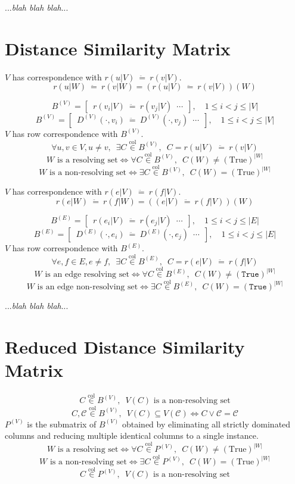 \documentclass{article}
\begin{document}
...\textit{blah blah blah}...

\clearpage
\section{Distance Similarity Matrix}

\(V\) has correspondence with \(r(u|V)\ \ddot{=}\ r(v|V)\).
\[ r(u|W)\ \ddot{=}\ r(v|W) = (r(u|V)\ \ddot{=}\ r(v|V))(W) \]

\[ B^{(V)} = \left[\enspace r(v_i|V)\ \ddot{=}\ r(v_j|V)\enspace \cdots\enspace \right],\quad 1 \leq i < j \leq |V| \]
\[ B^{(V)} = \left[\enspace D^{(V)}(\cdot, v_i)\ \ddot{=}\ D^{(V)}(\cdot, v_j) \enspace \cdots\enspace \right],\quad 1 \leq i < j \leq |V| \]
\(V\) has row correspondence with \(B^{(V)}\).
\[ \forall u, v \in V, u \neq v,\enspace \exists C \overset{\text{col}}{\in} B^{(V)},\enspace C = r(u|V)\ \ddot{=}\ r(v|V) \]
\[ W \text{ is a resolving set} \iff \forall C \overset{\text{col}}{\in} B^{(V)},\enspace C(W) \neq (\mathrm{True})^{|W|} \]
\[ W \text{ is a non-resolving set} \iff \exists C \overset{\text{col}}{\in} B^{(V)},\enspace C(W) = (\mathrm{True})^{|W|} \]

\vspace{2em}

\(V\) has correspondence with \(r(e|V)\ \ddot{=}\ r(f|V)\).
\[ r(e|W)\ \ddot{=}\ r(f|W) = ((e|V)\ \ddot{=}\ r(f|V))(W) \]

\[ B^{(E)} = \left[\enspace r(e_i|V)\ \ddot{=}\ r(e_j|V)\enspace \cdots\enspace \right],\quad 1 \leq i < j \leq |E| \]
\[ B^{(E)} = \left[\enspace D^{(E)}(\cdot, e_i)\ \ddot{=}\ D^{(E)}(\cdot, e_j) \enspace \cdots\enspace \right],\quad 1 \leq i < j \leq |E| \]
\(V\) has row correspondence with \(B^{(E)}\).
\[ \forall e, f \in E, e \neq f,\enspace \exists C \overset{\mathrm{col}}{\in} B^{(E)},\enspace C = r(e|V)\ \ddot{=}\ r(f|V) \]
\[ W \text{ is an edge resolving set} \iff \forall C \overset{\mathrm{col}}{\in} B^{(E)},\enspace C(W) \neq (\mathtt{True})^{|W|} \]
\[ W \text{ is an edge non-resolving set} \iff \exists C \overset{\mathrm{col}}{\in} B^{(E)},\enspace C(W) = (\mathtt{True})^{|W|} \]

...\textit{blah blah blah}...

\clearpage
\section{Reduced Distance Similarity Matrix}

\[ C \overset{\mathrm{col}}{\in} B^{(V)},\enspace V(C) \text{ is a non-resolving set} \]
\[ C, \mathcal{C} \overset{\mathrm{col}}{\in} B^{(V)},\enspace V(C) \subseteq V(\mathcal{C}) \iff C \vee \mathcal{C} = \mathcal{C} \]
\(P^{(V)}\) is the submatrix of \(B^{(V)}\) obtained by eliminating all strictly dominated columns and reducing multiple identical columns to a single instance.
\[ W \text{ is a resolving set} \iff \forall C \overset{\mathrm{col}}{\in} P^{(V)},\enspace C(W) \neq (\mathrm{True})^{|W|} \]
\[ W \text{ is a non-resolving set} \iff \exists C \overset{\mathrm{col}}{\in} P^{(V)},\enspace C(W) = (\mathrm{True})^{|W|} \]
\[ C \overset{\mathrm{col}}{\in} P^{(V)},\enspace V(C) \text{ is a non-resolving set} \]
\end{document}
